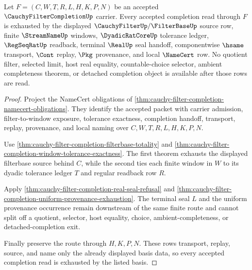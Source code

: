 \begin{theorem}
\label{thm:cauchy-filter-completion-real-seal-basis-exhaustion}
Let $F=(C,W,T,R,L,H,K,P,N)$ be an accepted $\CauchyFilterCompletionUp$ carrier. Every accepted completion read through $F$ is exhausted by the displayed $\CauchyFilterUp/\FilterBaseUp$ source row, finite $\StreamNameUp$ windows, $\DyadicRatCoreUp$ tolerance ledger, $\RegSeqRatUp$ readback, terminal $\RealUp$ seal handoff, componentwise $\hsame$ transport, $\Cont$ replay, $\Pkg$ provenance, and local $\NameCert$ row. No quotient filter, selected limit, host real equality, countable-choice selector, ambient completeness theorem, or detached completion object is available after those rows are read.
\end{theorem}
\begin{proof}
Project the NameCert obligations of \autoref{thm:cauchy-filter-completion-namecert-obligations}. They identify the accepted packet with carrier admission, filter-to-window exposure, tolerance exactness, completion handoff, transport, replay, provenance, and local naming over $C,W,T,R,L,H,K,P,N$.

Use \autoref{thm:cauchy-filter-completion-filterbase-totality} and \autoref{thm:cauchy-filter-completion-window-tolerance-exactness}. The first theorem exhausts the displayed filterbase source behind $C$, while the second ties each finite window in $W$ to its dyadic tolerance ledger $T$ and regular readback row $R$.

Apply \autoref{thm:cauchy-filter-completion-real-seal-refusal} and \autoref{thm:cauchy-filter-completion-uniform-provenance-exhaustion}. The terminal seal $L$ and the uniform provenance occurrence remain downstream of the same finite route and cannot split off a quotient, selector, host equality, choice, ambient-completeness, or detached-completion exit.

Finally preserve the route through $H,K,P,N$. These rows transport, replay, source, and name only the already displayed basis data, so every accepted completion read is exhausted by the listed basis.
\end{proof}



